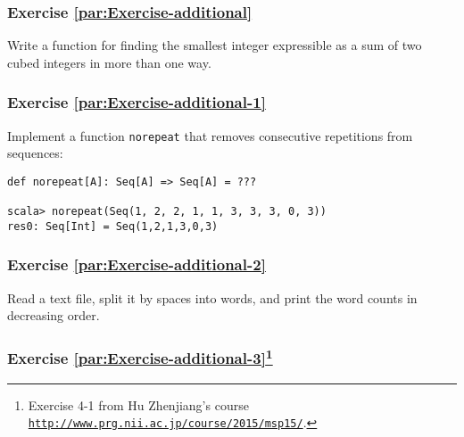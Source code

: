 \subsubsection{Exercise \label{par:Exercise-additional}\ref{par:Exercise-additional}}

Write a function for finding the smallest integer expressible as a
sum of two cubed integers in more than one way.

\subsubsection{Exercise \label{par:Exercise-additional-1}\ref{par:Exercise-additional-1}}

Implement a function \lstinline!norepeat! that removes consecutive
repetitions from sequences:
\begin{lstlisting}
def norepeat[A]: Seq[A] => Seq[A] = ???

scala> norepeat(Seq(1, 2, 2, 1, 1, 3, 3, 3, 0, 3))
res0: Seq[Int] = Seq(1,2,1,3,0,3)
\end{lstlisting}


\subsubsection{Exercise \label{par:Exercise-additional-2}\ref{par:Exercise-additional-2}}

Read a text file, split it by spaces into words, and print the word
counts in decreasing order.%
\begin{comment}
\begin{enumerate}
\item FPIS exercise 2.2: Check whether a sequence \lstinline!Seq[A]! is
sorted according to a given ordering function of type \lstinline!(A, A) => Boolean!.
\item FPIS exercise 3.24: Implement a function \lstinline!hasSubsequence!
that checks whether a \lstinline!List! contains another \lstinline!List!
as a subsequence. For instance, \lstinline!List(1,2,3,4)! would have
\lstinline!List(1,2)!, \lstinline!List(2,3)!, and \lstinline!List(4)!
as subsequences, among others. (Dynamic programming?)
\end{enumerate}
\end{comment}


\subsubsection{Exercise \label{par:Exercise-additional-3}\ref{par:Exercise-additional-3}\protect\footnote{Exercise 4-1 from Hu Zhenjiang\textsf{'}s course \texttt{\protect\href{http://www.prg.nii.ac.jp/course/2015/msp15/}{http://www.prg.nii.ac.jp/course/2015/msp15/}}.}}

